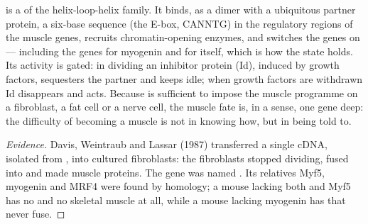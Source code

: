 \begin{proposition}\label{prop:b2:cell-differentiation:myod}
 is a  of the helix-loop-helix family. It
binds, as a dimer with a ubiquitous partner protein, a six-base
sequence (the E-box, CANNTG) in the regulatory regions of the muscle
genes, recruits chromatin-opening enzymes, and switches the genes on
--- including the genes for myogenin and for  itself, which is
how the state holds. Its activity is gated: in dividing  an
inhibitor protein (Id), induced by growth factors, sequesters the
partner and keeps  idle; when growth factors are withdrawn Id
disappears and  acts. Because  is sufficient to impose the
muscle programme on a fibroblast, a fat cell or a nerve cell, the
muscle fate is, in a sense, one gene deep: the difficulty of
becoming a muscle is not in knowing how, but in being told to.
\end{proposition}
\begin{proof}[Evidence]
Davis, Weintraub and Lassar (1987) transferred a single cDNA,
isolated from , into cultured fibroblasts: the fibroblasts
stopped dividing, fused into  and made muscle proteins.
The gene was named . Its relatives Myf5, myogenin and MRF4 were
found by homology; a mouse lacking both  and Myf5 has no
 and no skeletal muscle at all, while a mouse lacking
myogenin has  that never fuse.
\end{proof}


